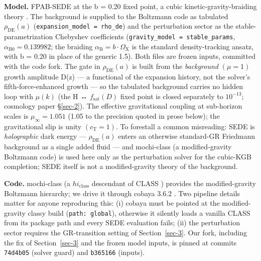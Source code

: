 \documentclass[preprint,12pt]{elsarticle}
\begin{document}
\textbf{Model.} FPAB-SEDE \citep{Pandev:2026cosmology, Pandev:2026count}
at the b = 0.20 fixed point, a cubic kinetic-gravity-braiding theory
\citep{Deffayet:2010qz}. The background is supplied to the Boltzmann
code as tabulated \(\rho _\mathrm{DE}(a)\)
(\texttt{expansion\_\allowbreak model\ =\ rho\_\allowbreak de}) and the perturbation sector as
the stable-parametrization \citep{Bellini:2014fua} Chebyshev
coefficients (\texttt{gravity\_\allowbreak model\ =\ stable\_\allowbreak params},
\(\alpha _{\mathrm{B0}} = 0.139982\); the braiding
\(\alpha _{\mathrm{B}} = b\cdot \Omega _{\mathrm{X}}\) is the standard
density-tracking ansatz, with b = 0.20 in place of the generic 1.5).
Both files are frozen inputs, committed with the code fork. The gate in
\(\rho _\mathrm{DE}(a)\) is built from the \emph{background}
\((\mu  = 1)\) growth amplitude D(z) --- a functional of the expansion
history, not the solver's fifth-force-enhanced growth --- so the
tabulated background carries no hidden loop with \(\mu (k)\) (the H ↔
\(f_{\mathrm{sat}}(D)\) fixed point is closed separately to
\(10^{-13}\); cosmology paper §\ref{sec-2}). The effective gravitational
coupling at sub-horizon scales is \(\mu _\infty  = 1.051\) (1.05 to the
precision quoted in prose below); the gravitational slip is unity
\((c_{\mathrm{T}} = 1)\). To forestall a common misreading: SEDE is
\emph{holographic} dark energy --- \(\rho _\mathrm{DE}(a)\) enters an
otherwise standard-GR Friedmann background as a single added fluid ---
and mochi-class (a modified-gravity Boltzmann code) is used here only as
the perturbation solver for the cubic-KGB completion; SEDE itself is not
a modified-gravity theory of the background.

\textbf{Code.} mochi-class \citep{Cataneo:2024uox} (a
\(hi_{\mathrm{class}}\) \citep{Zumalacarregui:2016pph} descendant of
CLASS \citep{Blas:2011rf}) provides the modified-gravity Boltzmann
hierarchy; we drive it through cobaya 3.6.2 \citep{Torrado:2020dgo}. Two
pipeline details matter for anyone reproducing this: (i) cobaya must be
pointed at the modified-gravity classy build (\texttt{path:\ global}),
otherwise it silently loads a vanilla CLASS from its package path and
every SEDE evaluation fails; (ii) the perturbation sector requires the
GR-transition setting of Section~\ref{sec-3}. Our fork, including the
fix of Section~\ref{sec-3} and the frozen model inputs, is pinned at
commits \texttt{74d4b05} (solver guard) and \texttt{b365166} (inputs).
\end{document}
